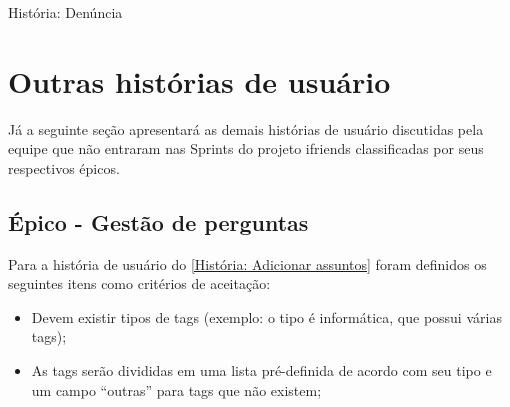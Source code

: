 \def\arraystretch{2}
\begin{quadro}[htb]
\centering
\ABNTEXfontereduzida
\caption[História: Denúncia]{História: Denúncia}
\label{História: Denúncia}
\end{quadro}
\FloatBarrier 

\chapter{Outras histórias de usuário}
\label{outras historias de usuario}
Já a seguinte seção apresentará as demais histórias de usuário discutidas pela equipe que não entraram nas \glspl{Sprint} do projeto \gls{ifriends} classificadas por seus respectivos épicos.

\section{Épico - Gestão de perguntas}
\label{outro_gestão_perguntas}

Para a história de usuário do \autoref{História: Adicionar assuntos} foram definidos os seguintes itens como critérios de aceitação:

\begin{itemize}
\item Devem existir tipos de tags (exemplo: o tipo é informática, que possui várias tags);
\item As tags serão divididas em uma lista pré-definida de acordo com seu tipo e um campo ``outras'' para tags que não existem;
\end{itemize}

